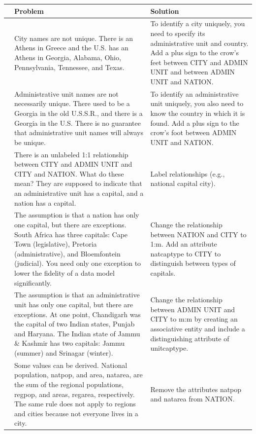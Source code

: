 \documentclass[
]{article}
\begin{document}
\begin{longtable}[]{@{}
  >{\raggedright\arraybackslash}p{}
  >{\raggedright\arraybackslash}p{}
  >{\raggedright\arraybackslash}p{}@{}}
\toprule
& Problem & Solution \\
\midrule
\endhead
1 & City names are not unique.
There is an Athens in
Greece and the U.S. has an
Athens in Georgia,
Alabama, Ohio,
Pennsylvania, Tennessee,
and Texas. & To identify a city
uniquely, you need to
specify its administrative
unit and country. Add a
plus sign to the crow's
feet between CITY and
ADMIN UNIT and between
ADMIN UNIT and NATION. \\
2 & Administrative unit names
are not necessarily
unique. There used to be a
Georgia in the old
U.S.S.R., and there is a
Georgia in the U.S. There
is no guarantee that
administrative unit names
will always be unique. & To identify an
administrative unit
uniquely, you also need to
know the country in which
it is found. Add a plus
sign to the crow's foot
between ADMIN UNIT and
NATION. \\
3 & There is an unlabeled 1:1
relationship between CITY
and ADMIN UNIT and CITY
and NATION. What do these
mean? They are supposed to
indicate that an
administrative unit has a
capital, and a nation has
a capital. & Label relationships (e.g.,
national capital city). \\
4 & The assumption is that a
nation has only one
capital, but there are
exceptions. South Africa
has three capitals: Cape
Town (legislative),
Pretoria (administrative),
and Bloemfontein
(judicial). You need only
one exception to lower the
fidelity of a data model
significantly. & Change the relationship
between NATION and CITY to
1:m. Add an attribute
natcaptype to CITY to
distinguish between types
of capitals. \\
5 & The assumption is that an
administrative unit has
only one capital, but
there are exceptions. At
one point, Chandigarh was
the capital of two Indian
states, Punjab and
Haryana. The Indian state
of Jammu \& Kashmir has two
capitals: Jammu (summer)
and Srinagar (winter). & Change the relationship
between ADMIN UNIT and
CITY to m:m by creating an
associative entity and
include a distinguishing
attribute of unitcaptype. \\
6 & Some values can be
derived. National
population, natpop, and
area, natarea, are the sum
of the regional
populations, regpop, and
areas, regarea,
respectively. The same
rule does not apply to
regions and cities because
not everyone lives in a
city. & Remove the attributes
natpop and natarea from
NATION. \\
\bottomrule
\end{longtable}
\end{document}
